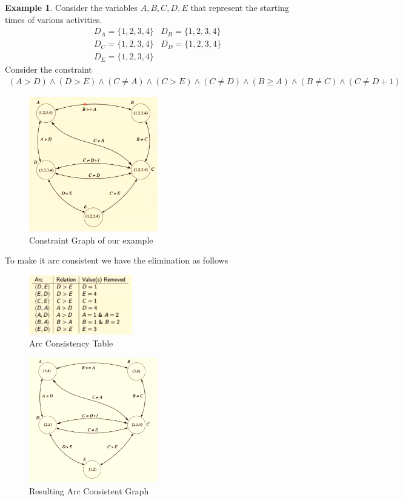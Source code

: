 \documentclass[a4paper]{article}
\theoremstyle{plain}
\theoremstyle{definition}
\newtheorem{exmp}{Example}[section]
\theoremstyle{remark}
\begin{document}
\begin{exmp}
	Consider the variables $A,B,C,D,E$ that represent the starting times of various activities.
	\begin{align*}
		D_A = \{1,2,3,4\}&
		D_B = \{1,2,3,4\}\\
		D_C = \{1,2,3,4\}&
		D_D = \{1,2,3,4\}\\
		D_E = \{1,2,3,4\}&
	\end{align*}
	Consider the constraint
	\begin{align*}
		(A>D) \land (D>E) \land (C \neq A) \land (C>E) \land (C \neq D) \land (B \ge A) \land (B \neq C) \land (C\neq D+1)
	\end{align*}
	\begin{figure}[H]
		\centering
		\includegraphics[width=0.5\textwidth]{two.png}
		\caption{Constraint Graph of our example}
		\label{fig:two-png}
	\end{figure}
	To make it arc consistent we have the elimination as follows
	\begin{figure}[H]
		\centering
		\includegraphics[width=0.4\textwidth]{arc.png}
		\caption{Arc Consistency Table}
		\label{fig:arc-png}
	\end{figure}
	\begin{figure}[H]
		\centering
		\includegraphics[width=0.5\textwidth]{three.png}
		\caption{Resulting Arc Consistent Graph}
		\label{fig:three-png}
	\end{figure}	
\end{exmp}
\end{document}
